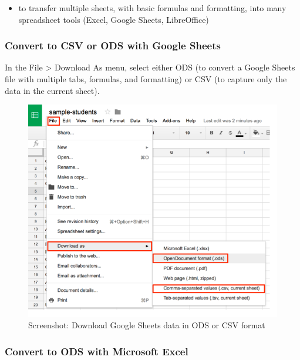 \documentclass[
  english,
]{book}
\providecommand{\tightlist}{%
  \setlength{\itemsep}{0pt}\setlength{\parskip}{0pt}}
\begin{document}
\begin{itemize}
\tightlist
\item
  to transfer multiple sheets, with basic formulas and formatting, into many spreadsheet tools (Excel, Google Sheets, LibreOffice)
\end{itemize}

\hypertarget{convert-to-csv-or-ods-with-google-sheets}{%
\subsubsection*{Convert to CSV or ODS with Google Sheets}\label{convert-to-csv-or-ods-with-google-sheets}}

In the File \textgreater{} Download As menu, select either ODS (to convert a Google Sheets file with multiple tabs, formulas, and formatting) or CSV (to capture only the data in the current sheet).

\begin{figure}
\centering
\includegraphics{images/02-spreadsheet/google-sheets-download-ods-csv.png}
\caption{Screenshot: Download Google Sheets data in ODS or CSV format}
\end{figure}

\hypertarget{convert-to-ods-with-microsoft-excel}{%
\subsubsection*{Convert to ODS with Microsoft Excel}\label{convert-to-ods-with-microsoft-excel}}
\end{document}

